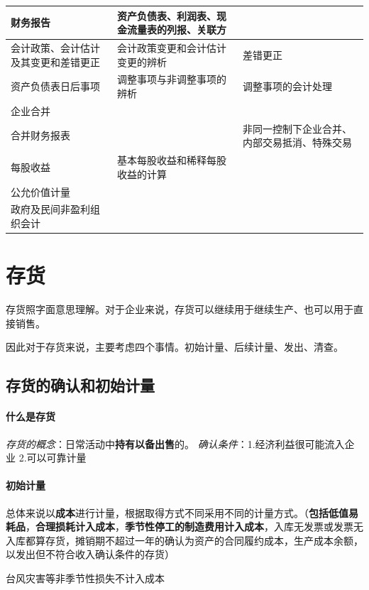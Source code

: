 \documentclass[UTF8,12pt]{ctexart}
\numberwithin{equation}{section} %
\numberwithin{figure}{section}
\numberwithin{table}{section}
\begin{document}
\begin{table}
\begin{tabularx}{\textwidth}{|X|X|X|}
			\hline
			财务报告& 资产负债表、利润表、现金流量表的列报、关联方 &   \\
			\hline
			会计政策、会计估计及其变更和差错更正& 会计政策变更和会计估计变更的辨析 & 差错更正  \\
			\hline
			资产负债表日后事项& 调整事项与非调整事项的辨析 & 调整事项的会计处理  \\
			\hline
			企业合并&  &   \\
			\hline
			合并财务报表&  & 非同一控制下企业合并、内部交易抵消、特殊交易  \\
			\hline
			每股收益& 基本每股收益和稀释每股收益的计算 &   \\
			\hline
			公允价值计量&  &   \\
			\hline
			政府及民间非盈利组织会计&  &   \\
			\hline
		\end{tabularx}
	\end{table}
	
	
	\newpage
	
	\section{存货}
	存货照字面意思理解。对于企业来说，存货可以继续用于继续生产、也可以用于直接销售。
	
	因此对于存货来说，主要考虑四个事情。初始计量、后续计量、发出、清查。
	
	\subsection{存货的确认和初始计量}
	\paragraph{什么是存货} 
	\textit{存货的概念}：日常活动中\textbf{持有以备出售}的。 
	\textit{确认条件}：1.经济利益很可能流入企业 2.可以可靠计量
	
	\paragraph{初始计量}
	总体来说以\textbf{成本}进行计量，根据取得方式不同采用不同的计量方式。（\textbf{包括低值易耗品}，\textbf{合理损耗计入成本}，\textbf{季节性停工的制造费用计入成本}，入库无发票或发票无入库都算存货，摊销期不超过一年的确认为资产的合同履约成本，生产成本余额，以发出但不符合收入确认条件的存货）
	
	台风灾害等非季节性损失不计入成本
	
\end{document}
